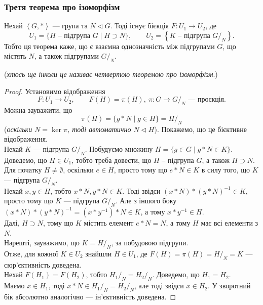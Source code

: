\documentclass{math_library}
\begin{document}

\subsubsection{Третя теорема про ізоморфізм}
\begin{theorem}
Нехай $\left< G, * \right>$ --- група та $N \triangleleft G$. Тоді існує бієкція $F \colon U_1 \to U_2$, де \[
U_1 = \{ H \text{ -- підгрупа } G \mid H \supset N\}, \qquad U_2 = \left\{ K \text{ -- підгрупа } G/_N\right\}.
\]
Тобто ця теорема каже, що є взаємна однозначність між підгрупами $G$, що містять $N$, а також підгрупами $G/_N$.
\end{theorem}

(\textit{хтось ще інколи це називає четвертою теоремою про ізоморфізм}.)

\begin{proof}
Установимо відображення 
\[ F \colon U_1 \to U_2, \qquad F(H) = \pi(H),\ \pi \colon G \to G/_N \text{ --- проєкція}.
\]
Можна зауважити, що 
\[
\pi(H) = \{g*N \mid g \in H\} = H/_N
\]
(\textit{оскільки $N = \ker \pi$, тоді автоматично $N \triangleleft H$}). Покажемо, що це бієктивне відображення.\\
Нехай $K$ --- підгрупа $G/_N$. Побудуємо множину $H = \{g \in G \mid g*N \in K\}$. Доведемо, що $H \in U_1$, тобто треба довести, що $H$ -- підгрупа $G$, а також $H \supset N$.\\
Для початку $H \neq \emptyset$, оскільки $e \in H$, просто тому що $e*N \in K$ в силу того, що $K$ --- підгрупа $G/_N$.\\
Нехай $x,y \in H$, тобто $x*N,y*N \in K$. Тоді звідси $(x*N)*(y*N)^{-1} \in K$, просто тому що $K$ --- підгрупа $G/_N$. Але з іншого боку $(x*N)*(y*N)^{-1} = (x*y^{-1})*N \in K$, а тому $x*y^{-1} \in H$.\\
Далі, $H \supset N$, тому що $K$ містить елемент $e*N = N$, а тому $H$ має всі елементи з $N$.\\
Нарешті, зауважимо, що $K = H/_N$, за побудовою підгрупи.\\
Отже, для кожної $K \in U_2$ знайшли $H \in U_1$, де $F(H) = \pi(H) = H/_N = K$ --- сюр'єктивність доведена.\\
Нехай $F(H_1) = F(H_2)$, тобто $H_1/_N = H_2/_N$. Доведемо, що $H_1 = H_2$.\\
Маємо $x \in H_1$, тоді $x*N \in H_1/_N = H_2/_N$, але тоді звідси $x \in H_2$. У зворотний бік абсолютно аналогічно --- ін'єктивність доведена.
\end{proof}
\end{document}
